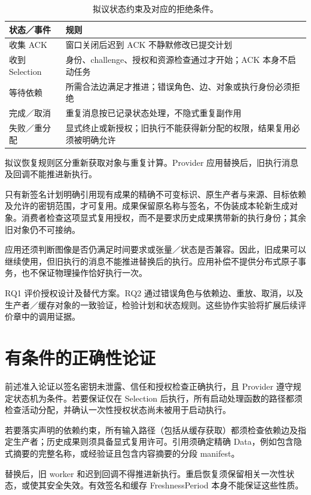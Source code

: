 \begin{table}[htbp]\centering\small
\caption{拟议状态约束及对应的拒绝条件。}
\begin{tabularx}{\textwidth}{p{}X}
\toprule 状态／事件 & 规则\\\midrule
收集 ACK & 窗口关闭后迟到 ACK 不静默修改已提交计划\\\midrule
收到 Selection & 身份、challenge、授权和资源检查通过才开始；ACK 本身不启动任务\\\midrule
等待依赖 & 所需合法边满足才推进；错误角色、边、对象或执行身份必须拒绝\\\midrule
完成／取消 & 重复消息按已记录状态处理，不隐式重复副作用\\\midrule
失败／重分配 & 显式终止或新授权；旧执行不能获得新分配的权限，结果复用必须被明确允许\\\bottomrule
\end{tabularx}\end{table}

拟议恢复规则区分重新获取对象与重复计算。Provider 应用替换后，旧执行消息及回调不能推进新执行。

只有新签名计划明确引用现有成果的精确不可变标识、原生产者与来源、目标依赖及允许的密钥范围，才可复用。成果保留原名称与签名，不伪装成本轮新生成对象。消费者检查这项显式复用授权，而不是要求历史成果携带新的执行身份；其余旧对象仍不可接纳。

应用还须判断图像是否仍满足时间要求或张量／状态是否兼容。因此，旧成果可以继续使用，但旧执行的消息不能推进替换后的执行。应用补偿不提供分布式原子事务，也不保证物理操作恰好执行一次。

RQ1 评价授权设计及替代方案。RQ2 通过错误角色与依赖边、重放、取消，以及生产者／缓存对象的一致验证，检验计划和状态规则。这些协作实验将扩展后续评价章中的调用证据。

\section{有条件的正确性论证}
前述准入论证以签名密钥未泄露、信任和授权检查正确执行，且 Provider 遵守规定状态机为条件。若要保证仅在 Selection 后执行，所有启动处理函数的路径都须检查活动分配，并确认一次性授权状态尚未被用于启动执行。

若要落实声明的依赖约束，所有输入路径（包括从缓存获取）都须检查依赖边及指定生产者；历史成果则须具备显式复用许可。引用须确定精确 Data，例如包含隐式摘要的完整名称，或经验证且包含内容摘要的分段 manifest。

替换后，旧 worker 和迟到回调不得推进新执行。重启恢复须保留相关一次性状态，或使其安全失效。有效签名和缓存 FreshnessPeriod 本身不能保证这些性质。

